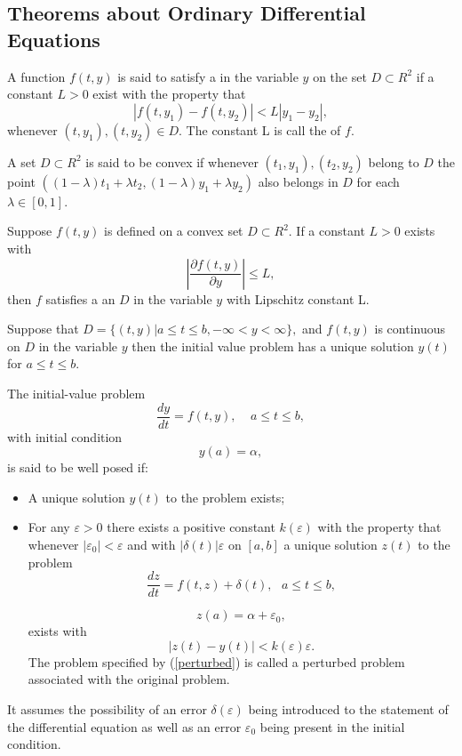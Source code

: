 \subsection{Theorems about Ordinary Differential Equations}
\begin{definition}
A function $f(t,y)$ is said to satisfy a \textbf{} in the variable $y$ on 
the set $D \subset R^2$ if a constant $L>0$ exist with the property that
\[|f(t,y_1)-f(t,y_2)| < L|y_1-y_2|, \]
whenever $(t,y_1),(t,y_2) \in D$.  The constant L is call the 
of $f$.
\end{definition}
\begin{definition}
A set $D\subset R^2$ is said to be convex if whenever $(t_1,y_1),(t_2,y_2)$ belong
to $D$ the point $((1-\lambda)t_1+\lambda t_2, (1-\lambda)y_1+\lambda y_2)$ also
belongs in $D$ for each $\lambda \in [0,1]$.
\end{definition}
\begin{theorem}
Suppose $f(t,y)$ is defined on a convex set $D \subset R^2$. If a constant
$L>0$ exists with
\[\left|\frac{\partial f(t,y)}{\partial y}\right|\leq L, \]
then $f$ satisfies a  an $D$ in the variable $y$ with
Lipschitz constant L.
\end{theorem}
\begin{theorem}
Suppose that
$D= \{(t,y) | a\leq t \leq b, -\infty <y < \infty \},$
and $f(t,y)$ is continuous on $D$ in the variable $y$ then the initial value
problem has a unique solution $y(t)$ for $a\leq t \leq b$.
\end{theorem}
\begin{definition}
The initial-value problem 
\[\frac{dy}{dt}=f(t,y), \ \ \ \ \  a\leq t \leq b,\]
with initial condition
\[y(a) = \alpha, \]
is said to be well posed if:
\begin{itemize}
\item
A unique solution $y(t)$ to the problem exists;
\item
For any $\varepsilon >0$ there exists a positive constant $k(\varepsilon)$
with the property that whenever $|\varepsilon_0| < \varepsilon$ and with
$|\delta(t)| \varepsilon$ on $[a,b]$ a unique solution $z(t)$ to the problem
\begin{equation} 
\label{perturbed}
\frac{dz}{dt}=f(t,z)+\delta(t), \ \ \  a\leq t \leq b, \end{equation}

\[z(a)=\alpha +\varepsilon_0, \]
exists with
\[ |z(t) - y(t) | < k(\varepsilon)\varepsilon. \]
The problem specified by (\ref{perturbed}) is called a perturbed problem associated
with the original problem.
\end{itemize}
It assumes the possibility of an error $\delta(\varepsilon)$ being introduced to
the statement of the differential equation as well as an error $\varepsilon_0$
being present in the initial condition.

\end{definition}
